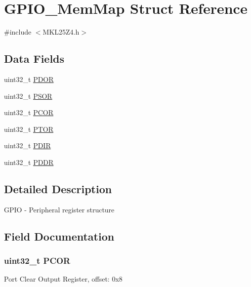 \hypertarget{struct_g_p_i_o___mem_map}{}\section{G\+P\+I\+O\+\_\+\+Mem\+Map Struct Reference}
\label{struct_g_p_i_o___mem_map}


{\ttfamily \#include $<$M\+K\+L25\+Z4.\+h$>$}

\subsection*{Data Fields}
\begin{DoxyCompactItemize}
\item 
uint32\+\_\+t \hyperlink{struct_g_p_i_o___mem_map_a6d8857d2ca1928bcedd1a83e93946aef}{P\+D\+O\+R}
\item 
uint32\+\_\+t \hyperlink{struct_g_p_i_o___mem_map_a2fc5ff57bdc9e1de4233930468cbf5e3}{P\+S\+O\+R}
\item 
uint32\+\_\+t \hyperlink{struct_g_p_i_o___mem_map_adba03f40e10aed5fc14d7ee0698aa6f2}{P\+C\+O\+R}
\item 
uint32\+\_\+t \hyperlink{struct_g_p_i_o___mem_map_a2a8b6ad3b774b37fcdf9a0f04f56e43b}{P\+T\+O\+R}
\item 
uint32\+\_\+t \hyperlink{struct_g_p_i_o___mem_map_a4c83a78320344c89b1663969a7c5d749}{P\+D\+I\+R}
\item 
uint32\+\_\+t \hyperlink{struct_g_p_i_o___mem_map_a37eee18eef001998403709bf78f4a33d}{P\+D\+D\+R}
\end{DoxyCompactItemize}


\subsection{Detailed Description}
G\+P\+I\+O -\/ Peripheral register structure 

\subsection{Field Documentation}
\hypertarget{struct_g_p_i_o___mem_map_adba03f40e10aed5fc14d7ee0698aa6f2}{}
\subsubsection[{P\+C\+O\+R}]{\setlength{\rightskip}{0pt plus 5cm}uint32\+\_\+t P\+C\+O\+R}\label{struct_g_p_i_o___mem_map_adba03f40e10aed5fc14d7ee0698aa6f2}
Port Clear Output Register, offset\+: 0x8 \hypertarget{struct_g_p_i_o___mem_map_a37eee18eef001998403709bf78f4a33d}{}
